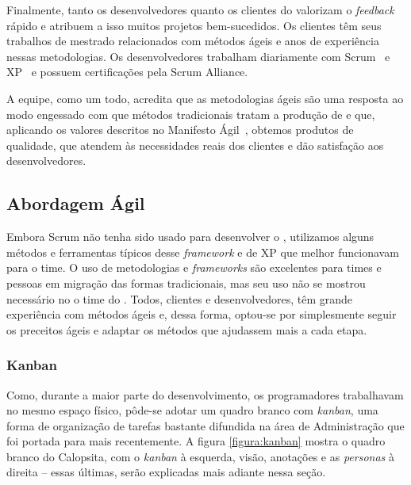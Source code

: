 Finalmente, tanto os desenvolvedores quanto os clientes do \calopsita{} valorizam o \textit{feedback} rápido e atribuem a isso muitos projetos bem-sucedidos. Os clientes têm seus trabalhos de mestrado relacionados com métodos ágeis e anos de experiência nessas metodologias. Os desenvolvedores trabalham diariamente com Scrum~\cite{scrum} e XP~\cite{xp} e possuem certificações pela Scrum Alliance. 

A equipe, como um todo, acredita que as metodologias ágeis são uma resposta ao modo engessado com que métodos tradicionais tratam a produção de \software{} e que, aplicando os valores descritos no Manifesto Ágil~\cite{manifesto}, obtemos produtos de qualidade, que atendem às necessidades reais dos clientes e dão satisfação aos desenvolvedores.  

\subsection{Abordagem Ágil}

Embora Scrum não tenha sido usado para desenvolver o \calopsita{}, utilizamos alguns métodos e ferramentas típicos desse \textit{framework} e de XP que melhor funcionavam para o time. O uso de metodologias e \textit{frameworks} são excelentes para times e pessoas em migração das formas tradicionais, mas seu uso não se mostrou necessário no o time do \calopista{}. Todos, clientes e desenvolvedores, têm grande experiência com métodos ágeis e, dessa forma, optou-se por simplesmente seguir os preceitos ágeis e adaptar os métodos que ajudassem mais a cada etapa. 

\subsubsection*{Kanban~\cite{kanban}}

Como, durante a maior parte do desenvolvimento, os programadores trabalhavam no mesmo espaço físico, pôde-se adotar um quadro branco com \textit{kanban}, uma forma de organização de tarefas bastante difundida na área de Administração que foi portada para \software{} mais recentemente. A figura \ref{figura:kanban} mostra o quadro branco do Calopsita, com o \textit{kanban} à esquerda, visão, anotações e as \textit{personas} à direita -- essas últimas, serão explicadas mais adiante nessa seção.


